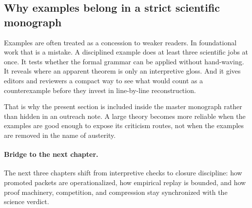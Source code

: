 \subsection{Why examples belong in a strict scientific monograph}

Examples are often treated as a concession to weaker readers. In foundational work that is a
mistake. A disciplined example does at least three scientific jobs at once. It tests whether the
formal grammar can be applied without hand-waving. It reveals where an apparent theorem is only an
interpretive gloss. And it gives editors and reviewers a compact way to see what would count as a
counterexample before they invest in line-by-line reconstruction.

That is why the present section is included inside the master monograph rather than hidden in an
outreach note. A large theory becomes more reliable when the examples are good enough to expose
its criticism routes, not when the examples are removed in the name of austerity.

\paragraph{Bridge to the next chapter.}
The next three chapters shift from interpretive checks to closure discipline:
how promoted packets are operationalized, how empirical replay is bounded, and
how proof machinery, competition, and compression stay synchronized with the
science verdict.

\clearpage
